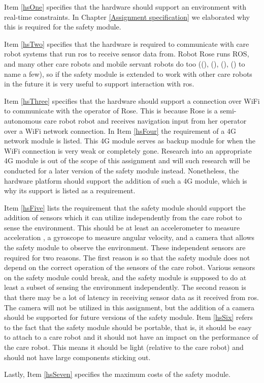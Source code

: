 \documentclass[12pt]{scrreprt}
\begin{document}
Item \ref{hsOne} specifies that the hardware should support an environment with real-time constraints. In Chapter \ref{Assignment specification} we elaborated why this is required for the safety module.
\par
Item \ref{hsTwo} specifies that the hardware is required to communicate with care robot systems that run \acrfull{ros} to receive sensor data from. Robot Rose runs ROS, and many other care robots and mobile servant robots do too ((\cite{human-robot}), (\cite{spencer}), (\cite{delgado}), (\cite{dimitris}) to name a few), so if the safety module is extended to work with other care robots in the future it is very useful to support interaction with \acrshort{ros}. 
\par
Item \ref{hsThree} specifies that the hardware should support a connection over WiFi to communicate with the operator of Rose. This is because Rose is a semi-autonomous care robot robot and receives navigation input from her operator over a WiFi network connection. In Item \ref{hsFour} the requirement of a 4G network module is listed. This 4G module serves as backup module for when the WiFi connection is very weak or completely gone. Research into an appropriate 4G module is out of the scope of this assignment and will such research will be conducted for a later version of the safety module instead. Nonetheless, the hardware platform should support the addition of such a 4G module, which is why its support is listed as a requirement.
\par
Item \ref{hsFive} lists the requirement that the safety module should support the addition of sensors which it can utilize independently from the care robot to sense the environment. This should be at least an accelerometer to measure acceleration , a gyroscope to measure angular velocity, and a camera that allows the safety module to observe the environment. These independent sensors are required for two reasons. The first reason is so that the safety module does not depend on the correct operation of the sensors of the care robot. Various sensors on the safety module could break, and the safety module is supposed to do at least a subset of sensing the environment independently. The second reason is that there may be a lot of latency in receiving sensor data as it received from \acrshort{ros}. The camera will not be utilized in this assignment, but the addition of a camera should be supported for future versions of the safety module. 
Item \ref{hsSix} refers to the fact that the safety module should be portable, that is, it should be easy to attach to a care robot and it should not have an impact on the performance of the care robot. This means it should be light (relative to the care robot) and should not have large components sticking out.
\par
Lastly, Item \ref{hsSeven} specifies the maximum costs of the safety module.
\end{document}
